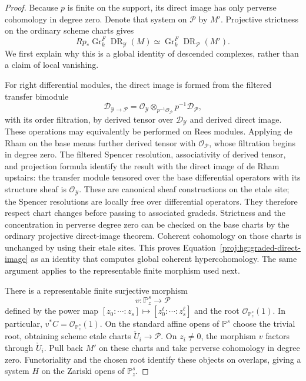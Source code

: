 \documentclass[11pt,letterpaper]{article}
\newcommand{\PP}{\mathbb{P}}
\newcommand{\OO}{\mathcal{O}}
\DeclareMathOperator{\Gr}{Gr}
\DeclareMathOperator{\DR}{DR}
\theoremstyle{definition}
\theoremstyle{remark}
\begin{document}
\begin{proof}
Because \(p\) is finite on the support, its direct image has only
perverse cohomology in degree zero.  Denote that system on
\(\mathcal P\) by \(M'\).  Projective strictness on the ordinary
scheme charts gives
\begin{equation}\label{proj:hg:graded-direct-image}
 Rp_*\Gr^F_k\DR_{\mathcal Y}(M)
 \simeq \Gr^F_k\DR_{\mathcal P}(M').
\end{equation}
We first explain why this is a global identity of descended complexes,
rather than a claim of local vanishing.

For right differential modules, the direct image is formed from the
filtered transfer bimodule
\[
 \mathcal D_{\mathcal Y\to\mathcal P}
 =
 \OO_{\mathcal Y}\otimes_{p^{-1}\OO_{\mathcal P}}
                         p^{-1}\mathcal D_{\mathcal P},
\]
with its order filtration, by derived tensor over
\(\mathcal D_{\mathcal Y}\) and derived direct image.  These operations
may equivalently be performed on Rees modules.  Applying de Rham on
the base means further derived tensor with \(\OO_{\mathcal P}\),
whose filtration begins in degree zero.  The filtered Spencer
resolution, associativity of derived tensor, and projection formula
identify the result with the direct image of de Rham upstairs:
the transfer module tensored over the base differential operators
with its structure sheaf is \(\OO_{\mathcal Y}\).
These are canonical sheaf constructions on the etale site; the
Spencer resolutions are locally free over differential operators.
They therefore respect chart changes before passing to associated
gradeds.  Strictness and the concentration in perverse degree zero
can be checked on the base charts by the ordinary projective
direct-image theorem.  Coherent cohomology on those charts is
unchanged by using their etale sites.  This proves
Equation~\eqref{proj:hg:graded-direct-image} as an identity that computes
global coherent hypercohomology.  The same argument applies to the
representable finite morphism used next.

There is a representable finite surjective morphism
\[
 v:\PP^s_z\longrightarrow\mathcal P
\]
defined by the power map
\([z_0:\cdots:z_s]\mapsto[z_0^\ell:\cdots:z_s^\ell]\)
and the root \(\OO_{\PP^s_z}(1)\).  In particular,
\(v^*C=\OO_{\PP^s_z}(1)\).  On the standard affine opens of \(\PP^s\)
choose the trivial root, obtaining scheme etale charts
\(\check U_i\to\mathcal P\).  On \(z_i\ne0\), the morphism \(v\)
factors through \(\check U_i\).  Pull back \(M'\) on these charts
and take perverse cohomology in degree zero.  Functoriality and the
chosen root identify these objects on overlaps, giving a system
\(H\) on the Zariski opens of \(\PP^s_z\).


\end{proof}
\end{document}
